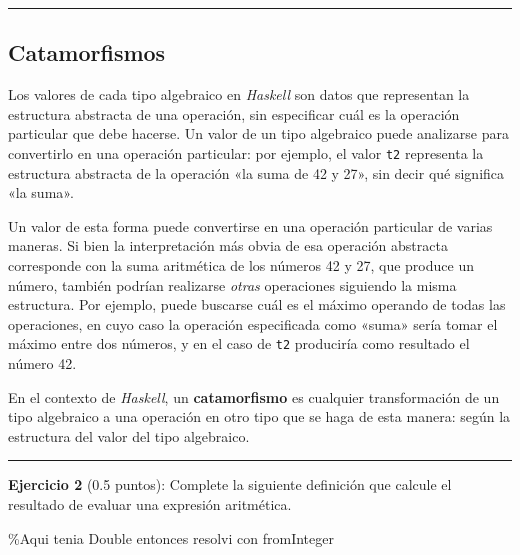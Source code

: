 \begin{center}\rule{3in}{0.4pt}\end{center}

\subsection{Catamorfismos}\label{catamorfismos}

Los valores de cada tipo algebraico en \emph{Haskell} son datos que
representan la estructura abstracta de una operación, sin especificar
cuál es la operación particular que debe hacerse. Un valor de un tipo
algebraico puede analizarse para convertirlo en una operación
particular: por ejemplo, el valor \texttt{t2} representa la estructura
abstracta de la operación «la suma de 42 y 27», sin decir qué significa
«la suma».

Un valor de esta forma puede convertirse en una operación particular de
varias maneras. Si bien la interpretación más obvia de esa operación
abstracta corresponde con la suma aritmética de los números 42 y 27, que
produce un número, también podrían realizarse \emph{otras} operaciones
siguiendo la misma estructura. Por ejemplo, puede buscarse cuál es el
máximo operando de todas las operaciones, en cuyo caso la operación
especificada como «suma» sería tomar el máximo entre dos números, y en
el caso de \texttt{t2} produciría como resultado el número 42.

En el contexto de \emph{Haskell}, un \textbf{catamorfismo} es cualquier
transformación de un tipo algebraico a una operación en otro tipo que se
haga de esta manera: según la estructura del valor del tipo algebraico.

\begin{center}\rule{3in}{0.4pt}\end{center}

\textbf{Ejercicio 2} (0.5 puntos): Complete la siguiente definición que
calcule el resultado de evaluar una expresión aritmética.

\%Aqui tenia Double entonces resolvi con fromInteger

\begin{Shaded}
\begin{Highlighting}[]
\OtherTok{->} 
  \FunctionTok{=}  
                 \OtherTok{->} \FunctionTok{+} 
                \OtherTok{->} \FunctionTok{-} 
      \OtherTok{->} \FunctionTok{*} 
      \OtherTok{->} \FunctionTok{/} 
             \OtherTok{->} \FunctionTok{*} \NormalTok{(}\FunctionTok{-}\NormalTok{)}
              \OtherTok{->} 
\end{Highlighting}
\end{Shaded}

